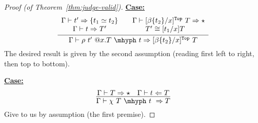 \documentclass{article}
\newcommand{\tpcheck}[0]{\Leftarrow}
\newcommand{\tpsynth}[0]{\Rightarrow}
\newcommand{\startcase}[1]{\vspace{#1} \noindent\textbf{\underline{Case:}}}
\begin{document}
\begin{proof}[Proof (of Theorem~\ref{thm:judge-valid})]
  \startcase{.2cm}
  \[
    \infer{\Gamma \vdash \rho\ t'\ @x.T\ \mhyph\ t \tpsynth [\beta\{t_2\}/x]^{\texttt{Top}}\ T}
    {
      \begin{array}{cc}
        \Gamma \vdash t' \tpsynth \{t_1 \simeq t_2\}
        & \quad \Gamma \vdash [\beta\{t_2\}/x]^{\texttt{Top}}\ T \tpsynth \star
        \\ \Gamma \vdash t \tpsynth T'
        & T' \cong [t_1/x]T
      \end{array}
    }    
  \]
  The desired result is given by the second assumption (reading first left to right, then top to bottom).


  \startcase{.2cm}
  \[
    \infer{\Gamma \vdash \chi\ T\ \mhyph\ t\ \tpsynth T}
    {\Gamma \vdash T \tpsynth \star & \Gamma \vdash t \tpcheck T}
  \]
  Give to us by assumption (the first premise).
\end{proof}
\end{document}
